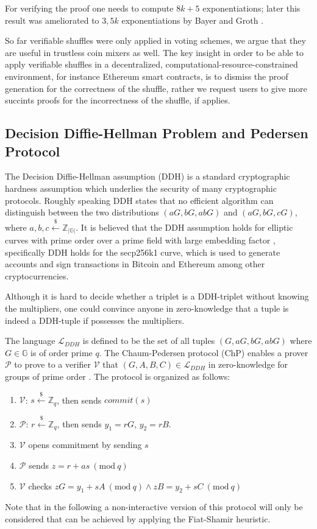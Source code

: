 \documentclass[conference, compsoc]{IEEEtran}
\theoremstyle{definition}
\newcommand{\Mod}[1]{\ (\mathrm{mod}\ #1)}
\begin{document}
For verifying the proof one needs to compute $8k+5$ exponentiations; later this result was ameliorated to $3,5k$ exponentiations by Bayer and Groth \cite{bayer2012efficient}.

So far verifiable shuffles were only applied in voting schemes, we argue that they are useful in trustless coin mixers as well. The key insight in order to be able to apply verifiable shuffles in a decentralized, computational-resource-constrained environment, for instance Ethereum smart contracts, is to dismiss the proof generation for the correctness of the shuffle, rather we request users to give more succints proofs for the incorrectness of the shuffle, if applies.   

\subsection{Decision Diffie-Hellman Problem and 
	Pedersen Protocol}

The Decision Diffie-Hellman assumption (DDH) is a standard cryptographic hardness assumption which underlies the security of many cryptographic protocols. Roughly speaking DDH states that no efficient algorithm can distinguish between the two distributions $(aG, bG, abG)$ and $(aG, bG, cG)$, where $a,b,c\stackrel{\$}{\leftarrow}\mathbb{Z}_{|\mathbb{G}|}$. It is believed that the DDH assumption holds for elliptic curves with prime order over a prime field with large embedding factor \cite{boneh1998decision}, specifically DDH holds for the secp256k1 curve, which is used to generate accounts and sign transactions in Bitcoin and Ethereum among other cryptocurrencies. 

Although it is hard to decide whether a triplet is a DDH-triplet without knowing the multipliers, one could convince anyone in zero-knowledge that a tuple is indeed a DDH-tuple if possesses the multipliers.    

The language $\mathcal{L}_{DDH}$ is defined to be the set of all tuples $(G,aG,bG,abG)$ where $G\in \mathbb{G}$ is of order prime $q$. The Chaum-Pedersen protocol (ChP) enables a prover $\mathcal{P}$ to prove to a verifier $\mathcal{V}$ that $(G,A,B,C)\in\mathcal{L}_{DDH}$ in zero-knowledge for groups of prime order \cite{chaum1992wallet}. The protocol is organized as follows:

\begin{enumerate}
	\item $\mathcal{V}$: $s\stackrel{\$}{\leftarrow}\mathbb{Z}_q$, then sends $commit(s)$ 
	\item $\mathcal{P}$: $r\stackrel{\$}{\leftarrow}\mathbb{Z}_q$, then sends $y_1=rG$, $y_2=rB$.
	\item $\mathcal{V}$ opens commitment by sending $s$
	\item $\mathcal{P}$ sends $z=r+as \Mod{q}$
	\item $\mathcal{V}$ checks $zG=y_{1}+sA \Mod{q} \land zB=y_{2}+sC \Mod{q}$
\end{enumerate} 
Note that in the following a non-interactive version of this protocol will only be considered that can be achieved by applying the Fiat-Shamir heuristic. 
\end{document}
